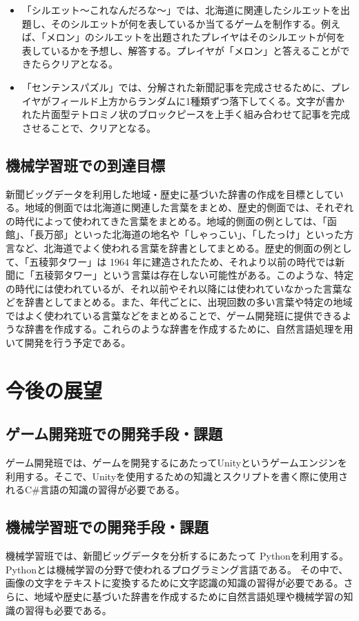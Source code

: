 \begin{itemize}
    \item 「シルエット～これなんだろな～」では、北海道に関連したシルエットを出題し、そのシルエットが何を表しているか当てるゲームを制作する。例えば、「メロン」のシルエットを出題されたプレイヤはそのシルエットが何を表しているかを予想し、解答する。プレイヤが「メロン」と答えることができたらクリアとなる。\\
    
    \item 「センテンスパズル」では、分解された新聞記事を完成させるために、プレイヤがフィールド上方からランダムに1種類ずつ落下してくる。文字が書かれた片面型テトロミノ状のブロックピースを上手く組み合わせて記事を完成させることで、クリアとなる。\\
    
\end{itemize}


\subsection{機械学習班での到達目標}
新聞ビッグデータを利用した地域・歴史に基づいた辞書の作成を目標としている。地域的側面では北海道に関連した言葉をまとめ、歴史的側面では、それぞれの時代によって使われてきた言葉をまとめる。地域的側面の例としては、「函館」、「長万部」といった北海道の地名や「しゃっこい」、「したっけ」といった方言など、北海道でよく使われる言葉を辞書としてまとめる。歴史的側面の例として、「五稜郭タワー」は 1964 年に建造されたため、それより以前の時代では新聞に「五稜郭タワー」という言葉は存在しない可能性がある。このような、特定の時代には使われているが、それ以前やそれ以降には使われていなかった言葉などを辞書としてまとめる。また、年代ごとに、出現回数の多い言葉や特定の地域ではよく使われている言葉などをまとめることで、ゲーム開発班に提供できるような辞書を作成する。これらのような辞書を作成するために、自然言語処理を用いて開発を行う予定である。

\newpage
\section{今後の展望}
\subsection{ゲーム開発班での開発手段・課題}
ゲーム開発班では、ゲームを開発するにあたってUnityというゲームエンジンを利用する。そこで、Unityを使用するための知識とスクリプトを書く際に使用されるC\#言語の知識の習得が必要である。

\subsection{機械学習班での開発手段・課題}
機械学習班では、新聞ビッグデータを分析するにあたって Pythonを利用する。Pythonとは機械学習の分野で使われるプログラミング言語である。
その中で、画像の文字をテキストに変換するために文字認識の知識の習得が必要である。さらに、地域や歴史に基づいた辞書を作成するために自然言語処理や機械学習の知識の習得も必要である。

